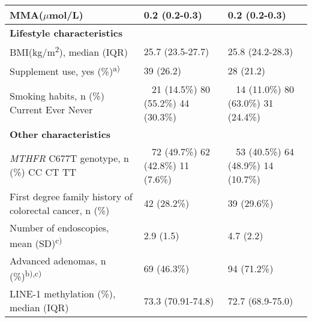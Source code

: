 \begin{table}
\begin{adjustbox}{width=\textwidth}
\begin{tabular}{C{5.5cm}C{3.5cm}C{3cm}}
\hline
{MMA(}\textrm{${\mu}$}{mol/L)} & 0.2 (0.2-0.3) & {0.2 (0.2-0.3})\\
\hline
\bfseries Lifestyle characteristics & ~ & ~ \\
\hline
{BMI(kg/m}{\textsuperscript{2}}{), median (IQR)} & 25.7 (23.5-27.7) & 25.8 (24.2-28.3)\\
\hline
 Supplement use, yes (\%)\textsuperscript{a)} & 39 (26.2) & 28 (21.2)\\
\hline
{ Smoking habits, n (\%)}{ Current}{ Ever} Never & ~ { 21 (14.5\%)}{ 80 (55.2\%)} 44 (30.3\%) & ~ { 14 (11.0\%)}{ 80 (63.0\%)} 31 (24.4\%)\\
\hline
\bfseries Other characteristics & ~ & ~ \\
\hline
{
{\textit{MTHFR}}{ C677T
genotype, n (\%)}}{ CC}{ CT} TT & ~ { 72 (49.7\%)}{ 62 (42.8\%)} 11 (7.6\%) & ~ { 53 (40.5\%)}{ 64 (48.9\%)} 14 (10.7\%)\\
\hline
 First degree family history of colorectal cancer, n (\%) & 42 (28.2\%) & 39 (29.6\%)\\
\hline
 Number of endoscopies, mean (SD)\textsuperscript{c)} & 2.9 (1.5) & 4.7 (2.2)\\
\hline
 Advanced adenomas, n
(\%)\textsuperscript{b),c)} & 69 (46.3\%) & 94 (71.2\%)\\
\hline
 LINE-1 methylation (\%), median (IQR) & 73.3 (70.91-74.8) & 72.7 (68.9-75.0)\\
\hline
\end{tabular}
\end{adjustbox}
\end{table}

